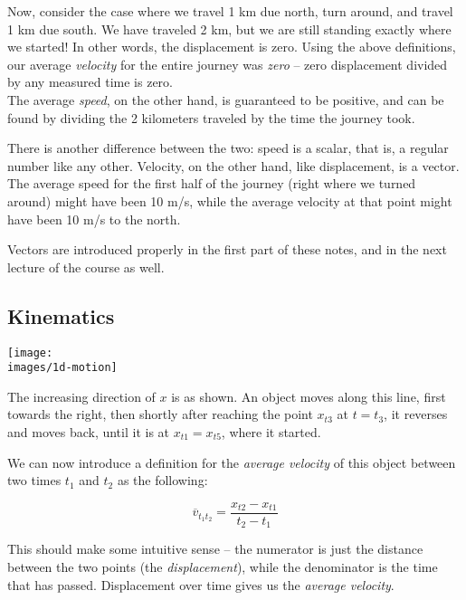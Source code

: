Now, consider the case where we travel 1 km due north, turn around, and travel 1 km due south. We have traveled 2 km, but we are still standing exactly where we started! In other words, the displacement is zero. Using the above definitions, our average \emph{velocity} for the entire journey was \emph{zero} -- zero displacement divided by any measured time is zero.\\
The average \emph{speed}, on the other hand, is guaranteed to be positive, and can be found by dividing the 2 kilometers traveled by the time the journey took.

There is another difference between the two: speed is a scalar, that is, a regular number like any other. Velocity, on the other hand, like displacement, is a vector.\\
The average speed for the first half of the journey (right where we turned around) might have been 10 m/s, while the average velocity at that point might have been 10 m/s to the north.

Vectors are introduced properly in the first part of these notes, and in the next lecture of the course as well.

\subsection{Kinematics}

\begin{center}
\texttt{[image: \\images/1d-motion]}
\end{center}

The increasing direction of $x$ is as shown. An object moves along this line, first towards the right, then shortly after reaching the point $x_{t3}$ at  $t = t_3$, it reverses and moves back, until it is at $x_{t1} = x_{t5}$, where it started.

We can now introduce a definition for the \emph{average velocity} of this object between two times $t_1$ and $t_2$ as the following:

\begingroup
\large
\begin{equation}
 \overbar{v}_{t_1 t_2} = \frac{x_{t2} - x_{t1}}{t_2 - t_1}
\end{equation}
\endgroup

This should make some intuitive sense -- the numerator is just the distance between the two points (the \emph{displacement}), while the denominator is the time that has passed. Displacement over time gives us the \emph{average velocity}.

